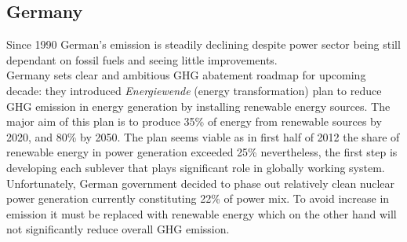 \documentclass[11pt, twocolumn]{article}
\begin{document}
\subsection{Germany}
Since 1990 German's emission is steadily declining despite power sector being still dependant on fossil fuels and seeing little improvements.\\
Germany sets clear and ambitious GHG abatement roadmap for upcoming decade: they introduced \emph{Energiewende} (energy transformation) plan to reduce GHG emission in energy generation by installing renewable energy sources. The major aim of this plan is to produce 35\% of energy from renewable sources by 2020, and 80\% by 2050. The plan seems viable as in first half of 2012 the share of renewable energy in power generation exceeded 25\% nevertheless, the first step is developing each sublever that plays significant role in globally working system.\\
Unfortunately, German government decided to phase out relatively clean nuclear power generation currently constituting 22\% of power mix. To avoid increase in emission it must be replaced with renewable energy which on the other hand will not significantly reduce overall GHG emission.\\
\end{document}
